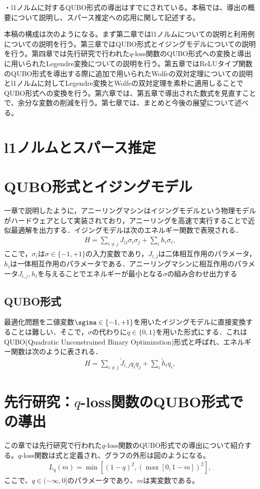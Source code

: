 \documentclass[paper]{ieicej}
\begin{document}
・l1ノルムに対するQUBO形式の導出はすでにされている。本稿では、導出の概要について説明し、スパース推定への応用に関して記述する。

本稿の構成は次のようになる。まず第二章ではl1ノルムについての説明と利用例についての説明を行う。第三章ではQUBO形式とイジングモデルについての説明を行う。第四章では先行研究で行われた$q$-loss関数のQUBO形式への変換と導出に用いられたLegendre変換についての説明を行う。第五章ではReLUタイプ関数のQUBO形式を導出する際に追加で用いられたWolfeの双対定理についての説明とl1ノルムに対してLegendre変換とWolfeの双対定理を素朴に適用しることでQUBO形式への変換を行う。第六章では、第五章で導出された数式を見直すことで、余分な変数の削減を行う。第七章では、まとめと今後の展望について述べる。


\section{l1ノルムとスパース推定}
\section{QUBO形式とイジングモデル}
一章で説明したように，アニーリングマシンはイジングモデルという物理モデルがハードウェアとして実装されており，アニーリングを高速で実行することで近似最適解を出力する．イジングモデルは次のエネルギー関数で表現される．
\begin{eqnarray}
 H = \sum_{i\neq j}{J_{ij}\sigma_{i}\sigma_{j}}+\sum_{i}{h_{i}\sigma_{i}}, \label{Ising_model}
\end{eqnarray}
ここで，$\sigma_{i}$は$\sigma\in\{-1,+1\}$の入力変数であり，$J_{i,j}$は二体相互作用のパラメータ，$h_{i}$は一体相互作用のパラメータである．アニーリングマシンに相互作用のパラメータ$J_{i,j},h_{i}$を与えることでエネルギーが最小となる$\sigma$の組み合わせ出力する
\subsection{QUBO形式}
最適化問題を二値変数$\sgima\in\{-1,+1\}$を用いたイジングモデルに直接変換することは難しい．そこで，$\sigma$の代わりに$q\in\{0,1\}$を用いた形式にする．これはQUBO(Quadratic Unconstrained Binary Optimization)形式と呼ばれ、エネルギー関数は次のように表される．
\begin{eqnarray}
 H = \sum_{i\neq j}{\widetilde{J}_{i,j}q_{i}q_{j}}+\sum_{i}{\widetilde{h}_{i}q_{i}}, \label{QUBO_model}
\end{eqnarray}

\section{先行研究：$q$-loss関数のQUBO形式での導出}
この章では先行研究で行われた$q$-loss関数のQUBO形式での導出について紹介する。$q$-loss関数は式と定義され、グラフの外形は図のようになる。
\begin{eqnarray}
 L_{q}(m) = \min{[(1-q)^{2},(\max{[0,1-m]})^{2}]},
\end{eqnarray}
ここで、$q\in(-\infty,0]$のパラメータであり、$m$は実変数である。
\end{document}
